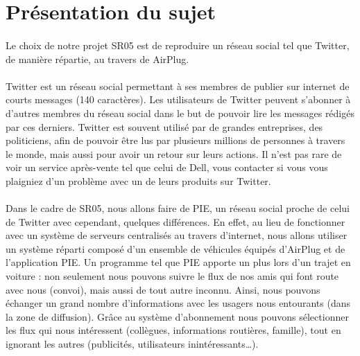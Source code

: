 
\section{Présentation du sujet}

\paragraph{}
Le choix de notre projet SR05 est de reproduire un réseau social tel que Twitter, de manière répartie, au travers de AirPlug.

\paragraph{}
Twitter est un réseau social permettant à ses membres de publier sur internet de courts messages (140 caractères). Les utilisateurs de Twitter peuvent s'abonner à d'autres membres du réseau social dans le but de pouvoir lire les messages rédigés par ces derniers.
Twitter est souvent utilisé par de grandes entreprises, des politiciens, afin de pouvoir être lus par plusieurs millions de personnes à travers le monde, mais aussi pour avoir un retour sur leurs actions. Il n'est pas rare de voir un service après-vente tel que celui de Dell, vous contacter si vous vous plaigniez d'un problème avec un de leurs produits sur Twitter.

\paragraph{}
Dans le cadre de SR05, nous allons faire de PIE, un réseau social proche de celui de Twitter avec cependant, quelques différences.
En effet, au lieu de fonctionner avec un système de serveurs centralisés au travers d'internet, nous allons utiliser un système réparti composé d'un ensemble de véhicules équipés d'AirPlug et de l'application PIE.
Un programme tel que PIE apporte un plus lors d'un trajet en voiture : non seulement nous pouvons suivre le flux de nos amis qui font route avec nous (convoi), mais aussi de tout autre inconnu. Ainsi, nous pouvons échanger un grand nombre d'informations avec les usagers nous entourants (dans la zone de diffusion). Grâce au système d'abonnement nous pouvons sélectionner les flux qui nous intéressent (collègues, informations routières, famille), tout en ignorant les autres (publicités, utilisateurs inintéressants\ldots).

